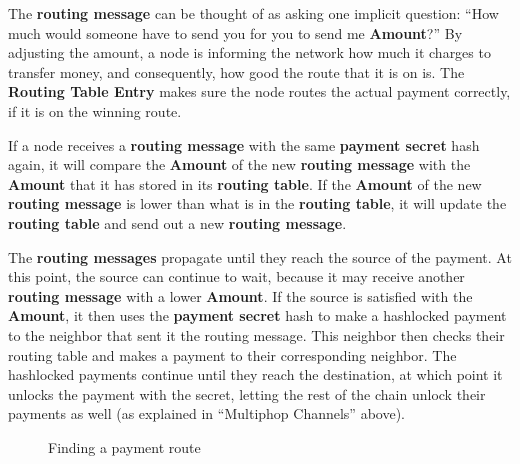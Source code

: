 \documentclass[a4paper]{article}
\newcommand{\bgls}[1]{\textbf{\gls{#1}}}
\newcommand{\bglspl}[1]{\textbf{\glspl{#1}}}
\begin{document}
The \bgls{routing message} can be thought of as asking one implicit question: ``How much would someone have to send you for you to send me \textbf{Amount}?'' By adjusting the amount, a node is informing the network how much it charges to transfer money, and consequently, how good the route that it is on is. The \textbf{Routing Table Entry} makes sure the node routes the actual payment correctly, if it is on the winning route.

If a node receives a \bgls{routing message} with the same \bgls{payment secret} hash again, it will compare the \textbf{Amount} of the new \bgls{routing message} with the \textbf{Amount} that it has stored in its \bgls{routing table}. If the \textbf{Amount} of the new \bgls{routing message} is lower than what is in the \bgls{routing table}, it will update the \bgls{routing table} and send out a new \bgls{routing message}.

The \bglspl{routing message} propagate until they reach the source of the payment. At this point, the source can continue to wait, because it may receive another \bgls{routing message} with a lower \textbf{Amount}. If the source is satisfied with the \textbf{Amount}, it then uses the \bgls{payment secret} hash to make a hashlocked payment to the neighbor that sent it the routing message. This neighbor then checks their routing table and makes a payment to their corresponding neighbor. The hashlocked payments continue until they reach the destination, at which point it unlocks the payment with the secret, letting the rest of the chain unlock their payments as well (as explained in ``Multiphop Channels'' above).

\pagebreak

\begin{figure}[H]
\centering
{}
\caption{Finding a payment route}
\end{figure}
\end{document}
